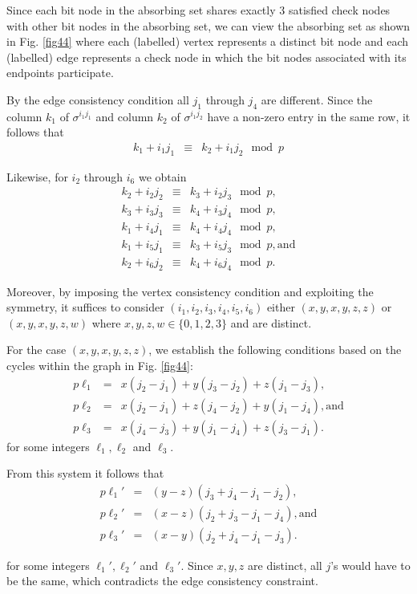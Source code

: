 Since each bit node in the absorbing set shares exactly 3
satisfied check nodes with other bit nodes in the absorbing set,
we can view the absorbing set as shown in Fig. \ref{fig44} where
each (labelled) vertex represents a distinct bit node and each
(labelled) edge represents a check node in which the bit nodes
associated with its endpoints participate.

By the edge consistency condition all $j_1$ through $j_4$ are
different. Since the column $k_1$ of $\sigma^{i_1j_1}$ and column
$k_2$ of $\sigma^{i_1j_2}$ have a non-zero entry in the same row,
it follows that
\begin{eqnarray*}
k_1+i_1j_1 &\equiv & k_2+i_1j_2 \mod p
\end{eqnarray*}

Likewise, for $i_2$ through $i_6$ we obtain
\begin{eqnarray*}
k_2+i_2j_2 &\equiv& k_3+i_2j_3 \mod p, \\
k_3+i_3j_3 &\equiv& k_4+i_3j_4 \mod p, \\
k_1+i_4j_1 &\equiv& k_4+i_4j_4 \mod p, \\
k_1+i_5j_1 &\equiv& k_3+i_5j_3 \mod p, \text{and}\\
k_2+i_6j_2 &\equiv& k_4+i_6j_4 \mod p.
\end{eqnarray*}

Moreover, by imposing the vertex consistency condition and
exploiting the symmetry, it suffices to consider
$(i_1,i_2,i_3,i_4,i_5,i_6)$ either $(x,y,x,y,z,z)$ or
$(x,y,x,y,z,w)$ where $x,y,z,w \in \{0,1,2,3 \}$ and are distinct.

For the case $(x,y,x,y,z,z)$, we establish the following
conditions based on the cycles within the graph in Fig.
\ref{fig44}:
\begin{eqnarray*}
p\ell_1&=&x(j_2-j_1)+y(j_3-j_2)+z(j_1-j_3), \\
p\ell_2&=&x(j_2-j_1)+z(j_4-j_2)+y(j_1-j_4),\text{and}\\
p\ell_3&=&x(j_4-j_3)+y(j_1-j_4)+z(j_3-j_1).
\end{eqnarray*}
for some integers $\ell_1,\ell_2$ and $\ell_3$.

From this system it follows that
\begin{eqnarray*}
p\ell_1'&=&(y-z)(j_3+j_4-j_1-j_2),\\
p\ell_2'&=&(x-z)(j_2+j_3-j_1-j_4),\text{and}\\
p\ell_3'&=&(x-y)(j_2+j_4-j_1-j_3).
\end{eqnarray*}

\noindent for some integers $\ell_1',\ell_2'$ and $\ell_3'$. Since
$x,y,z$ are distinct, all $j$'s would have to be the same, which
contradicts the edge consistency constraint.

